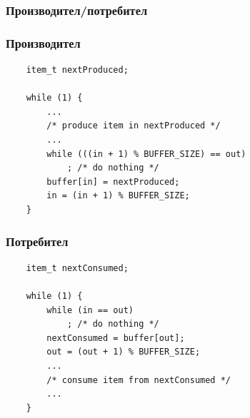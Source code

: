 \documentclass[ignorenonframetext, hyperref=unicode]{beamer}
\begin{document}
\begin{frame}
\frametitle{Производител/потребител}
\begin{figure}[h]
\center
{}
\end{figure}
\end{frame}
\begin{frame}[containsverbatim]
\frametitle{Производител}
\begin{lstlisting}
	item_t nextProduced;

	while (1) {
		...
		/* produce item in nextProduced */
		...
		while (((in + 1) % BUFFER_SIZE) == out)
			; /* do nothing */
		buffer[in] = nextProduced;
		in = (in + 1) % BUFFER_SIZE;
	}
\end{lstlisting}
\end{frame}


\begin{frame}[containsverbatim]
\frametitle{Потребител}
\begin{lstlisting}
	item_t nextConsumed;

	while (1) {
		while (in == out)
			; /* do nothing */
		nextConsumed = buffer[out];
		out = (out + 1) % BUFFER_SIZE;
		...
		/* consume item from nextConsumed */		
		...
	}
\end{lstlisting}
\end{frame}
\end{document}
